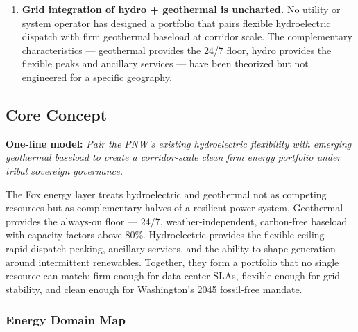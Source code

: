 \documentclass[11pt,letterpaper]{article}
\begin{document}
\begin{enumerate}[leftmargin=2em]
\item \textbf{Grid integration of hydro + geothermal is uncharted.} No utility or system operator has designed a portfolio that pairs flexible hydroelectric dispatch with firm geothermal baseload at corridor scale. The complementary characteristics --- geothermal provides the 24/7 floor, hydro provides the flexible peaks and ancillary services --- have been theorized but not engineered for a specific geography.
\end{enumerate}

\subsection{Core Concept}

\textbf{One-line model:} \textit{Pair the PNW's existing hydroelectric flexibility with emerging geothermal baseload to create a corridor-scale clean firm energy portfolio under tribal sovereign governance.}

The Fox energy layer treats hydroelectric and geothermal not as competing resources but as complementary halves of a resilient power system. Geothermal provides the always-on floor --- 24/7, weather-independent, carbon-free baseload with capacity factors above 80\%. Hydroelectric provides the flexible ceiling --- rapid-dispatch peaking, ancillary services, and the ability to shape generation around intermittent renewables. Together, they form a portfolio that no single resource can match: firm enough for data center SLAs, flexible enough for grid stability, and clean enough for Washington's 2045 fossil-free mandate.

\subsubsection{Energy Domain Map}
\end{document}
